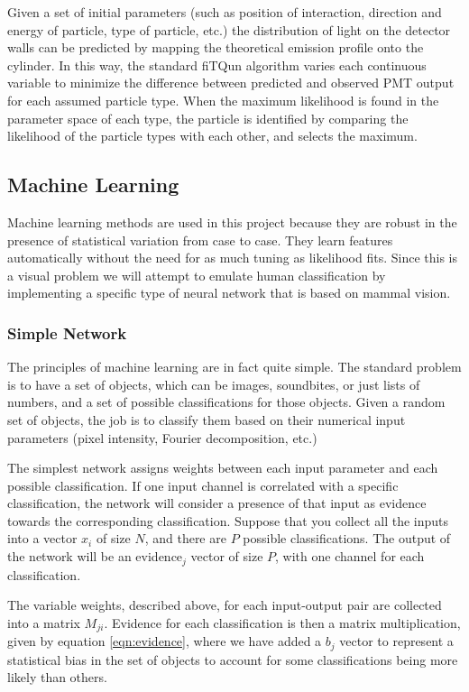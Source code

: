 \documentclass[twoside,twocolumn]{article}
\begin{document}
Given a set of initial parameters (such as position of interaction, direction and energy of particle, type of particle, etc.) the distribution of light on the detector walls can be predicted by mapping the theoretical emission profile onto the cylinder. In this way, the standard fiTQun algorithm varies each continuous variable to minimize the difference between predicted and observed PMT output for each assumed particle type. When the maximum likelihood is found in the parameter space of each type, the particle is identified by comparing the likelihood of the particle types with each other, and selects the maximum.

\subsection{Machine Learning}

Machine learning methods are used in this project because they are robust in the presence of statistical variation from case to case. They learn features automatically without the need for as much tuning as likelihood fits. Since this is a visual problem we will attempt to emulate human classification by implementing a specific type of neural network that is based on mammal vision.

\subsubsection{Simple Network}

The principles of machine learning are in fact quite simple. The standard problem is to have a set of objects, which can be images, soundbites, or just lists of numbers, and a set of possible classifications for those objects. Given a random set of objects, the job is to classify them based on their numerical input parameters (pixel intensity, Fourier decomposition, etc.) 

The simplest network assigns weights between each input parameter and each possible classification. If one input channel is correlated with a specific classification, the network will consider a presence of that input as evidence towards the corresponding classification. Suppose that you collect all the inputs into a vector $x_i$ of size $N$, and there are $P$ possible classifications. The output of the network will be an evidence$_j$ vector of size $P$, with one channel for each classification.

The variable weights, described above, for each input-output pair are collected into a matrix $M_{ji}$. Evidence for each classification is then a matrix multiplication, given by equation \ref{eqn:evidence}, where we have added a $b_j$ vector to represent a statistical bias in the set of objects to account for some classifications being more likely than others.
\end{document}
